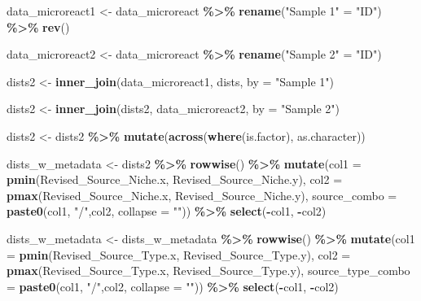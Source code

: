 \documentclass[
]{article}
\newenvironment{Shaded}{\begin{snugshade}}{\end{snugshade}}
\newcommand{\AttributeTok}[1]{\textcolor[rgb]{0.13,0.29,0.53}{#1}}
\newcommand{\FunctionTok}[1]{\textcolor[rgb]{0.13,0.29,0.53}{\textbf{#1}}}
\newcommand{\NormalTok}[1]{#1}
\newcommand{\OtherTok}[1]{\textcolor[rgb]{0.56,0.35,0.01}{#1}}
\newcommand{\SpecialCharTok}[1]{\textcolor[rgb]{0.81,0.36,0.00}{\textbf{#1}}}
\newcommand{\StringTok}[1]{\textcolor[rgb]{0.31,0.60,0.02}{#1}}
\begin{document}
\begin{Shaded}
\begin{Highlighting}[]
\NormalTok{                data\_microreact1 }\OtherTok{\textless{}{-}}\NormalTok{ data\_microreact }\SpecialCharTok{\%\textgreater{}\%} \FunctionTok{rename}\NormalTok{(}\StringTok{"Sample 1"} \OtherTok{=} \StringTok{"ID"}\NormalTok{) }\SpecialCharTok{\%\textgreater{}\%} \FunctionTok{rev}\NormalTok{()}
                
\NormalTok{                data\_microreact2 }\OtherTok{\textless{}{-}}\NormalTok{ data\_microreact }\SpecialCharTok{\%\textgreater{}\%} \FunctionTok{rename}\NormalTok{(}\StringTok{"Sample 2"} \OtherTok{=} \StringTok{"ID"}\NormalTok{)}
                
\NormalTok{                dists2 }\OtherTok{\textless{}{-}} \FunctionTok{inner\_join}\NormalTok{(data\_microreact1, dists, }\AttributeTok{by =} \StringTok{"Sample 1"}\NormalTok{)}
                
\NormalTok{                dists2 }\OtherTok{\textless{}{-}} \FunctionTok{inner\_join}\NormalTok{(dists2, data\_microreact2, }\AttributeTok{by =} \StringTok{"Sample 2"}\NormalTok{)}
                
\NormalTok{                dists2 }\OtherTok{\textless{}{-}}\NormalTok{ dists2 }\SpecialCharTok{\%\textgreater{}\%} \FunctionTok{mutate}\NormalTok{(}\FunctionTok{across}\NormalTok{(}\FunctionTok{where}\NormalTok{(is.factor), as.character))}
                
\NormalTok{                dists\_w\_metadata }\OtherTok{\textless{}{-}}\NormalTok{ dists2 }\SpecialCharTok{\%\textgreater{}\%} \FunctionTok{rowwise}\NormalTok{() }\SpecialCharTok{\%\textgreater{}\%}
                        \FunctionTok{mutate}\NormalTok{(}\AttributeTok{col1 =} \FunctionTok{pmin}\NormalTok{(Revised\_Source\_Niche.x, Revised\_Source\_Niche.y), }\AttributeTok{col2 =} \FunctionTok{pmax}\NormalTok{(Revised\_Source\_Niche.x, Revised\_Source\_Niche.y), }\AttributeTok{source\_combo =} \FunctionTok{paste0}\NormalTok{(col1, }\StringTok{"/"}\NormalTok{,col2, }\AttributeTok{collapse =} \StringTok{""}\NormalTok{)) }\SpecialCharTok{\%\textgreater{}\%} \FunctionTok{select}\NormalTok{(}\SpecialCharTok{{-}}\NormalTok{col1, }\SpecialCharTok{{-}}\NormalTok{col2)}
                
\NormalTok{                dists\_w\_metadata }\OtherTok{\textless{}{-}}\NormalTok{ dists\_w\_metadata }\SpecialCharTok{\%\textgreater{}\%} \FunctionTok{rowwise}\NormalTok{() }\SpecialCharTok{\%\textgreater{}\%}
                        \FunctionTok{mutate}\NormalTok{(}\AttributeTok{col1 =} \FunctionTok{pmin}\NormalTok{(Revised\_Source\_Type.x, Revised\_Source\_Type.y), }\AttributeTok{col2 =} \FunctionTok{pmax}\NormalTok{(Revised\_Source\_Type.x, Revised\_Source\_Type.y), }\AttributeTok{source\_type\_combo =} \FunctionTok{paste0}\NormalTok{(col1, }\StringTok{"/"}\NormalTok{,col2, }\AttributeTok{collapse =} \StringTok{""}\NormalTok{)) }\SpecialCharTok{\%\textgreater{}\%} \FunctionTok{select}\NormalTok{(}\SpecialCharTok{{-}}\NormalTok{col1, }\SpecialCharTok{{-}}\NormalTok{col2)}
                

\end{Highlighting}
\end{Shaded}
\end{document}
